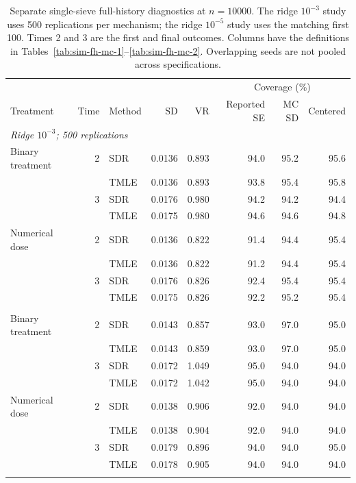 \begin{table}[!htbp]
\centering\small
\setlength{\tabcolsep}{4pt}
\caption{Separate single-sieve full-history diagnostics at $n=10000$. The ridge $10^{-3}$ study uses 500 replications per mechanism; the ridge $10^{-5}$ study uses the matching first 100. Times 2 and 3 are the first and final outcomes. Columns have the definitions in Tables~\ref{tab:sim-fh-mc-1}--\ref{tab:sim-fh-mc-2}. Overlapping seeds are not pooled across specifications.}
\label{tab:sim-fh-diagnostic-mc}
\begin{tabular}{lrl*{5}{r}}
\toprule
& & & & & \multicolumn{3}{c}{Coverage (\%)}\\
Treatment & Time & Method & SD & VR & Reported SE & MC SD & Centered\\
\midrule
\multicolumn{8}{l}{\textit{Ridge $10^{-3}$; 500 replications}}\\
Binary treatment & 2 & SDR & 0.0136 & 0.893 & 94.0 & 95.2 & 95.6\\
 &  & TMLE & 0.0136 & 0.893 & 93.8 & 95.4 & 95.8\\
\addlinespace[2pt]
 & 3 & SDR & 0.0176 & 0.980 & 94.2 & 94.2 & 94.4\\
 &  & TMLE & 0.0175 & 0.980 & 94.6 & 94.6 & 94.8\\
\addlinespace[2pt]
Numerical dose & 2 & SDR & 0.0136 & 0.822 & 91.4 & 94.4 & 95.4\\
 &  & TMLE & 0.0136 & 0.822 & 91.2 & 94.4 & 95.4\\
\addlinespace[2pt]
 & 3 & SDR & 0.0176 & 0.826 & 92.4 & 95.4 & 95.4\\
 &  & TMLE & 0.0175 & 0.826 & 92.2 & 95.2 & 95.4\\
\addlinespace[2pt]
\midrule
\multicolumn{8}{l}{\textit{Ridge $10^{-5}$; 100 replications}}\\
Binary treatment & 2 & SDR & 0.0143 & 0.857 & 93.0 & 97.0 & 95.0\\
 &  & TMLE & 0.0143 & 0.859 & 93.0 & 97.0 & 95.0\\
\addlinespace[2pt]
 & 3 & SDR & 0.0172 & 1.049 & 95.0 & 94.0 & 94.0\\
 &  & TMLE & 0.0172 & 1.042 & 95.0 & 94.0 & 94.0\\
\addlinespace[2pt]
Numerical dose & 2 & SDR & 0.0138 & 0.906 & 92.0 & 94.0 & 94.0\\
 &  & TMLE & 0.0138 & 0.904 & 92.0 & 94.0 & 94.0\\
\addlinespace[2pt]
 & 3 & SDR & 0.0179 & 0.896 & 94.0 & 94.0 & 95.0\\
 &  & TMLE & 0.0178 & 0.905 & 94.0 & 94.0 & 94.0\\
\addlinespace[2pt]
\bottomrule
\end{tabular}
\end{table}
